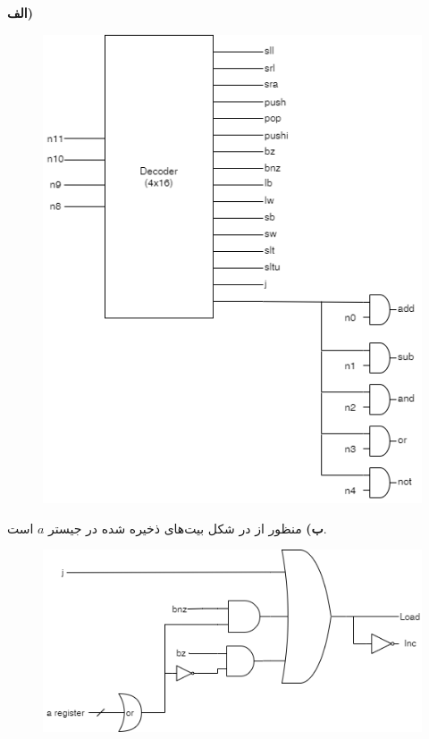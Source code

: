 
\noindent
\textbf{الف)}
\begin{figure}[H]
    \centering
    \includegraphics[scale=0.5]{source/4-1.png}
    \label{4-1-circuit}
\end{figure}

\noindent
\textbf{ب)}
منظور از
در شکل بیت‌های ذخیره شده در جیستر
$a$
است.
\begin{figure}[H]
    \centering
    \includegraphics[scale=0.5]{source/4-2.png}
    \label{4-2-circuit}
\end{figure}